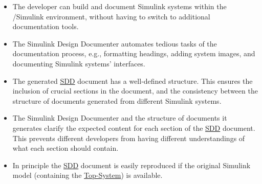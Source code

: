 \documentclass{mcscert}
\newcommand{\simulink}{Simulink}
\newcommand{\sddtool}{Simulink Design Documenter}
\newcommand{\topsystemnolink}{Top-System} %
\newcommand{\topsystem}{\hyperref[def:topsystem]{\topsystemnolink{}}}
\begin{document}
    \begin{itemize}
	  \item The developer can build and document \simulink{} systems within the 
	  \matlab{}/\simulink{} environment, without having to switch to additional 
	  documentation tools.
      \item The \sddtool{} automates tedious tasks of the documentation process,
      e.g., formatting headings, adding system images, and documenting \simulink{}
      systems' interfaces.
      \item The generated \hyperref[acr:sdd]{SDD} document has a well-defined structure. 
      This ensures the inclusion of crucial sections in the document, 
      and the consistency between the structure of documents generated from 
      different \simulink{} systems.
      \item The \sddtool{} and the structure of documents it generates clarify 
      the expected content for each section of the \hyperref[acr:sdd]{SDD} document. 
      This prevents different developers from having different understandings of
      what each section should contain.
      \item In principle the \hyperref[acr:sdd]{SDD} document is easily reproduced if the original \simulink{} 
      model (containing the \topsystem{}) is available.
    \end{itemize}

\end{document}
